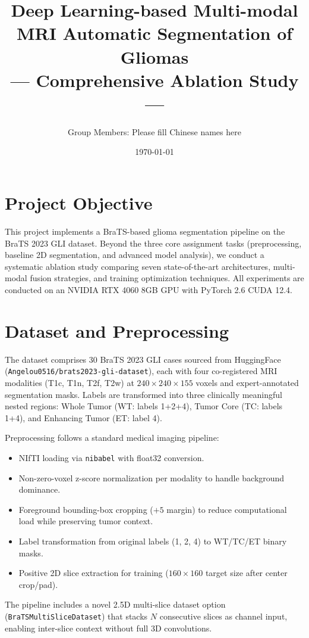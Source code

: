 \documentclass[11pt,a4paper]{article}
\title{Deep Learning-based Multi-modal MRI Automatic Segmentation of Gliomas\\--- Comprehensive Ablation Study ---}
\author{Group Members: Please fill Chinese names here}
\date{\today}
\begin{document}
\maketitle

\section{Project Objective}
This project implements a BraTS-based glioma segmentation pipeline on the BraTS 2023 GLI dataset. Beyond the three core assignment tasks (preprocessing, baseline 2D segmentation, and advanced model analysis), we conduct a systematic ablation study comparing seven state-of-the-art architectures, multi-modal fusion strategies, and training optimization techniques. All experiments are conducted on an NVIDIA RTX 4060 8GB GPU with PyTorch 2.6 CUDA 12.4.

\section{Dataset and Preprocessing}
The dataset comprises 30 BraTS 2023 GLI cases sourced from HuggingFace (\texttt{Angelou0516/brats2023-gli-dataset}), each with four co-registered MRI modalities (T1c, T1n, T2f, T2w) at $240\times240\times155$ voxels and expert-annotated segmentation masks. Labels are transformed into three clinically meaningful nested regions: Whole Tumor (WT: labels 1+2+4), Tumor Core (TC: labels 1+4), and Enhancing Tumor (ET: label 4).

Preprocessing follows a standard medical imaging pipeline:
\begin{itemize}
  \item NIfTI loading via \texttt{nibabel} with float32 conversion.
  \item Non-zero-voxel z-score normalization per modality to handle background dominance.
  \item Foreground bounding-box cropping ($+5$ margin) to reduce computational load while preserving tumor context.
  \item Label transformation from original labels (1, 2, 4) to WT/TC/ET binary masks.
  \item Positive 2D slice extraction for training ($160\times160$ target size after center crop/pad).
\end{itemize}

The pipeline includes a novel 2.5D multi-slice dataset option (\texttt{BraTSMultiSliceDataset}) that stacks $N$ consecutive slices as channel input, enabling inter-slice context without full 3D convolutions.
\end{document}
